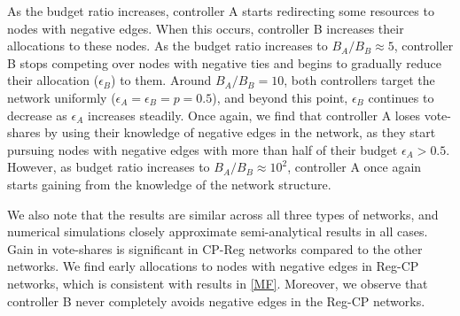  As the budget ratio increases, controller A starts redirecting some resources to nodes with negative edges. When this occurs, controller B increases their allocations to these nodes. As the budget ratio increases to $B_{A}/B_{B} \approx 5$, controller B stops competing over nodes with negative ties and begins to gradually reduce their allocation ($\epsilon_{B}$) to them. Around $B_{A}/B_{B} = 10$, both controllers target the network uniformly ($\epsilon_{A} = \epsilon_{B} = p = 0.5$), and beyond this point, $\epsilon_{B}$ continues to decrease as $\epsilon_{A}$ increases steadily. Once again, we find that controller A loses vote-shares by using their knowledge of negative edges in the network, as they start pursuing nodes with negative edges with more than half of their budget $\epsilon_{A} > 0.5$. However, as budget ratio increases to $B_{A}/B_{B} \approx 10^2$, controller A once again starts gaining from the knowledge of the network structure.
 
We also note that the results are similar across all three types of networks, and numerical simulations closely approximate semi-analytical results in all cases. Gain in vote-shares is significant in CP-Reg networks compared to the other networks. We find early allocations to nodes with negative edges in Reg-CP networks, which is consistent with results in \cref{MF}. Moreover, we observe that controller B never completely avoids negative edges in the Reg-CP networks. 